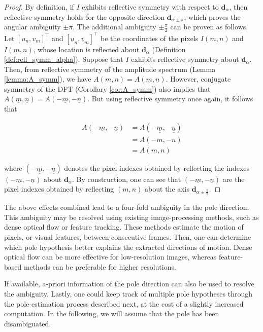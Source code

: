 \begin{proof}
    By definition, if $I$ exhibits reflective symmetry with respect to $\mathbf{d}_\alpha$, then reflective symmetry holds for the opposite direction $\mathbf{d}_{\alpha \pm \pi}$, which proves the angular ambiguity $\pm \pi$. The additional ambiguity $\pm \frac{\pi}{2}$ can be proven as follows. Let $[u_n,v_m]^\top$ and $[\underline{u}_n,\underline{v}_m]^\top$ be the coordinates of the pixels $I(m,n)$ and $I(\underline{m},\underline{n})$, whose location is reflected about $\mathbf{d}_\alpha$ (Definition \ref{def:refl_symm_alpha}). Suppose that $I$ exhibits reflective symmetry about $\mathbf{d}_\alpha$. Then, from reflective symmetry of the amplitude spectrum (Lemma \ref{lemma:A_symm}), we have $A(m,n)=A(\underline{m},\underline{n})$. However, conjugate symmetry of the DFT (Corollary \ref{cor:A_symm}) also implies that $A(\underline{m},\underline{n})=A(-\underline{m},-\underline{n})$. But using reflective symmetry once again, it follows that
    
    \begin{align}
        A(-\underline{m},-\underline{n})&=A(-\underline{\underline{m}},-\underline{\underline{n}})\\
        &=A(-m,-n)\\
        &=A(m,n)
    \end{align}

    where $(-\underline{\underline{m}},-\underline{\underline{n}})$ denotes the pixel indexes obtained by reflecting the indexes $(-\underline{m},-\underline{n})$ about $\mathbf{d}_\alpha$. By construction, one can see that $(-\underline{m},-\underline{n})$ are the pixel indexes obtained by reflecting $(m,n)$ about the axis $\mathbf{d}_{\alpha \pm \frac{\pi}{2}}$. 
\end{proof}

The above effects combined lead to a four-fold ambiguity in the pole direction. This ambiguity may be resolved using existing image-processing methods, such as dense optical flow or feature tracking\cite{farneback2003two}. These methods estimate the motion of pixels, or visual features, between consecutive frames. Then, one can determine which pole hypothesis better explains the extracted directions of motion. Dense optical flow can be more effective for low-resolution images, whereas feature-based methods can be preferable for higher resolutions.

If available, a-priori information of the pole direction can also be used to resolve the ambiguity. Lastly, one could keep track of multiple pole hypotheses through the pole-estimation process described next, at the cost of a slightly increased computation. In the following, we will assume that the pole has been disambiguated.

